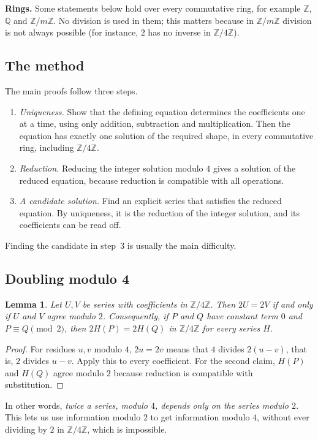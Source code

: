 \documentclass[11pt,a4paper]{article}
\newtheorem{lemma}[theorem]{Lemma}
\theoremstyle{definition}
\theoremstyle{remark}
\newcommand{\Z}{\mathbb{Z}}
\newcommand{\Q}{\mathbb{Q}}
\newcommand{\para}[1]{\par\medskip\noindent\textbf{#1}\enspace}
\begin{document}
\para{Rings.} Some statements below hold over every commutative ring, for example $\Z$, $\Q$ and $\Z/m\Z$. No
division is used in them; this matters because in $\Z/m\Z$ division is not always possible (for instance, $2$ has no inverse in
$\Z/4\Z$).

\subsection{The method}
The main proofs follow three steps.
\begin{enumerate}
\item \emph{Uniqueness.} Show that the defining equation determines the coefficients one at a time, using only
addition, subtraction and multiplication. Then the equation has exactly one solution of the required shape, in every
commutative ring, including $\Z/4\Z$.
\item \emph{Reduction.} Reducing the integer solution modulo $4$ gives a solution of the reduced equation,
because reduction is compatible with all operations.
\item \emph{A candidate solution.} Find an explicit series that satisfies the reduced equation. By uniqueness, it is
the reduction of the integer solution, and its coefficients can be read off.
\end{enumerate}
Finding the candidate in step~3 is usually the main difficulty.
\subsection{Doubling modulo 4}
\begin{lemma}\label{lem:double}
Let $U,V$ be series with coefficients in $\Z/4\Z$. Then $2U=2V$ if and only if $U$ and $V$ agree modulo $2$.
Consequently, if $P$ and $Q$ have constant term $0$ and $P\equiv Q\pmod 2$, then $2H(P)=2H(Q)$ in $\Z/4\Z$ for every
series $H$.
\end{lemma}

\begin{proof}
For residues $u,v$ modulo $4$, $2u=2v$ means that $4$ divides $2(u-v)$, that is, $2$ divides $u-v$. Apply this to
every coefficient. For the second claim, $H(P)$ and $H(Q)$ agree modulo $2$ because reduction is compatible with
substitution.
\end{proof}
In other words, \emph{twice a series, modulo $4$, depends only on the series modulo $2$.} This lets us use information modulo
$2$ to get information modulo $4$, without ever dividing by $2$ in $\Z/4\Z$, which is impossible.
\end{document}
